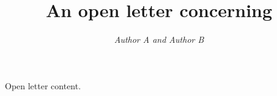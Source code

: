 \documentclass[11pt]{article}
\begin{document}
\title{\bf An open letter concerning \\
\vspace{5mm}{\em   Title   }}
\author{\large\em Author A and Author B}

\date{} %

\maketitle

Open letter content.
\end{document}
